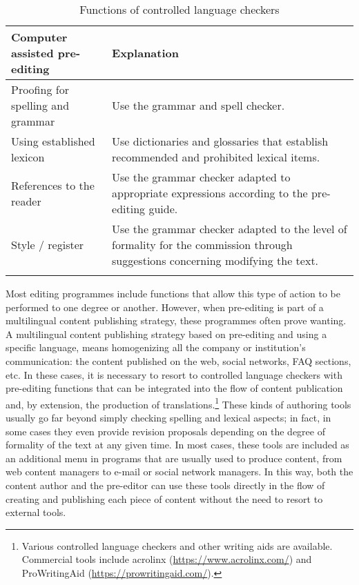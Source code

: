 \documentclass[output=paper,colorlinks,citecolor=brown,
]{langscibook}
\begin{document}
\begin{table}
\begin{tabularx}{\textwidth}{lQ}
\lsptoprule
{Computer assisted pre-editing} & {Explanation}\\
\midrule
Proofing for spelling and grammar & Use the grammar and spell checker.\\
\tablevspace

Using established lexicon & Use dictionaries and glossaries that establish recommended and prohibited lexical items.\\
\tablevspace

References to the reader & Use the grammar checker adapted to appropriate expressions according to the pre-editing guide.\\
\tablevspace

Style / register & Use the grammar checker adapted to the level of formality for the commission through suggestions concerning modifying the text.\\
\lspbottomrule
\end{tabularx}
\caption{Functions of controlled language checkers}
\label{tab:sanchez:5}
\end{table}

Most editing programmes include functions that allow this type of action to be performed to one degree or another. However, when pre-editing is part of a multilingual content publishing strategy, these programmes often prove wanting. A multilingual content publishing strategy based on pre-editing and using a specific language, means homogenizing all the company or institution’s communication: the content published on the web, social networks, FAQ sections, etc. In these cases, it is necessary to resort to controlled language checkers with pre-editing functions that can be integrated into the flow of content publication and, by extension, the production of translations.\footnote{Various controlled language checkers and other writing aids are available. Commercial tools include acrolinx (\url{https://www.acrolinx.com/}) and ProWritingAid  (\url{https://prowritingaid.com/}).}  These kinds of authoring tools usually go far beyond simply checking spelling and lexical aspects; in fact, in some cases they even provide revision proposals depending on the degree of formality of the text at any given time. In most cases, these tools are included as an additional menu in programs that are usually used to produce content, from web content managers to e-mail or social network managers. In this way, both the content author and the pre-editor can use these tools directly in the flow of creating and publishing each piece of content without the need to resort to external tools. 
\end{document}

